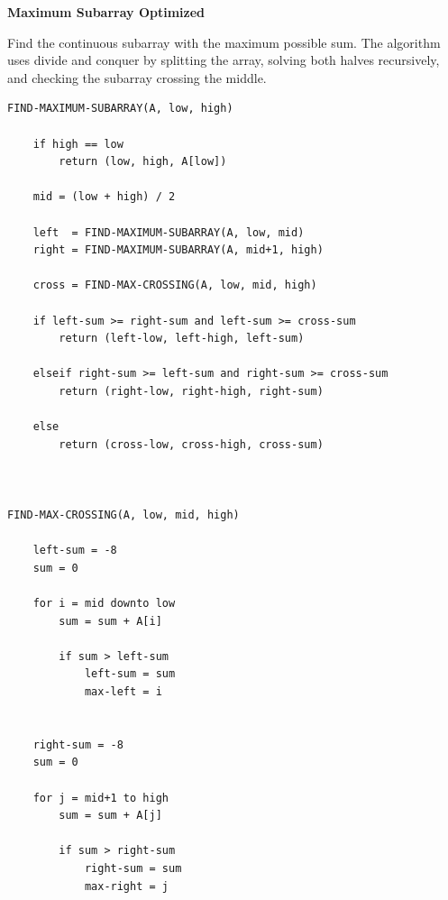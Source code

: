 \documentclass[a4paper,12pt]{article}
\begin{document}
\begin{tcolorbox}[
    colback=gray!30,
    colframe=black,
    boxrule=1pt,
    arc=0mm
]

\begin{tcolorbox}[
    colback=gray!10,
    colframe=black,
    arc=0mm
]
\centering
{\Huge\bfseries Maximum Subarray Optimized}
\end{tcolorbox}


\begin{tcolorbox}[
    colback=gray!10,
    colframe=black,
    arc=0mm
]
\small
Find the continuous subarray with the maximum possible sum.
The algorithm uses divide and conquer by splitting the array,
solving both halves recursively, and checking the subarray crossing the middle.
\end{tcolorbox}


\begin{tcolorbox}[
    colback=black!5,
    colframe=black,
    arc=0mm,
    title=Pseudo-code
]
\tiny
\begin{lstlisting}
FIND-MAXIMUM-SUBARRAY(A, low, high)

    if high == low
        return (low, high, A[low])

    mid = (low + high) / 2

    left  = FIND-MAXIMUM-SUBARRAY(A, low, mid)
    right = FIND-MAXIMUM-SUBARRAY(A, mid+1, high)

    cross = FIND-MAX-CROSSING(A, low, mid, high)

    if left-sum >= right-sum and left-sum >= cross-sum
        return (left-low, left-high, left-sum)

    elseif right-sum >= left-sum and right-sum >= cross-sum
        return (right-low, right-high, right-sum)

    else
        return (cross-low, cross-high, cross-sum)



FIND-MAX-CROSSING(A, low, mid, high)

    left-sum = -8
    sum = 0

    for i = mid downto low
        sum = sum + A[i]

        if sum > left-sum
            left-sum = sum
            max-left = i


    right-sum = -8
    sum = 0

    for j = mid+1 to high
        sum = sum + A[j]

        if sum > right-sum
            right-sum = sum
            max-right = j



\end{lstlisting}
\end{tcolorbox}
\end{tcolorbox}
\end{document}
